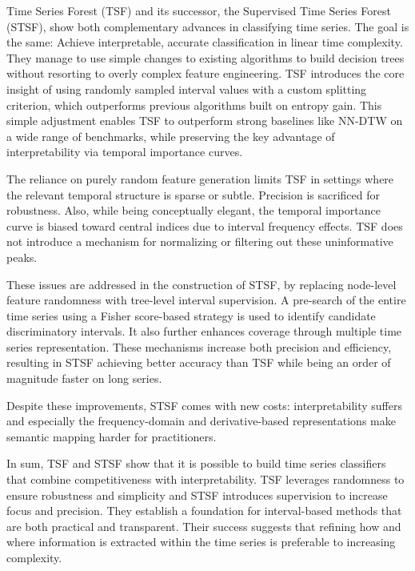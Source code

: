 Time Series Forest (TSF) and 
its successor, the Supervised Time
Series Forest (STSF), show both 
complementary advances in
classifying time series. 
The goal is the same: 
Achieve interpretable, 
accurate classification in linear 
time complexity. They manage to use 
simple changes to existing algorithms to 
build decision trees without 
resorting to overly complex feature
engineering. TSF introduces the 
core insight of using randomly 
sampled interval values with a 
custom splitting criterion, which 
outperforms previous algorithms 
built on entropy gain. This simple 
adjustment enables TSF to outperform
strong baselines like NN-DTW on a 
wide range of benchmarks, while preserving
the key advantage of interpretability
via temporal importance curves.

The reliance on purely random feature 
generation limits TSF in settings where
the relevant temporal structure is 
sparse or subtle. Precision is sacrificed
for robustness. Also, while being conceptually
elegant, the temporal importance curve
is biased toward central indices due 
to interval frequency effects. TSF 
does not introduce a mechanism for 
normalizing or filtering out these uninformative
peaks.

These issues are addressed in the 
construction of STSF, by replacing
node-level feature randomness with 
tree-level interval supervision. 
A pre-search of the entire time series
using a Fisher score-based strategy
is used to identify candidate discriminatory
intervals. It also further enhances
coverage through multiple time series representation.
These mechanisms increase both precision
and efficiency, resulting in STSF
achieving better accuracy than TSF while
being an order of magnitude faster on
long series.

Despite these improvements, STSF 
comes with new costs: interpretability
suffers and especially the frequency-domain and
derivative-based representations make
semantic mapping harder for practitioners.


In sum, TSF and STSF show that it 
is possible to build time series
classifiers that combine competitiveness with
interpretability. TSF leverages randomness to
ensure robustness and simplicity and
STSF introduces supervision to increase
focus and precision. They establish
a foundation for interval-based
methods that are both practical and
transparent. Their success suggests
that refining how and where information
is extracted within the time series
is preferable to increasing complexity.